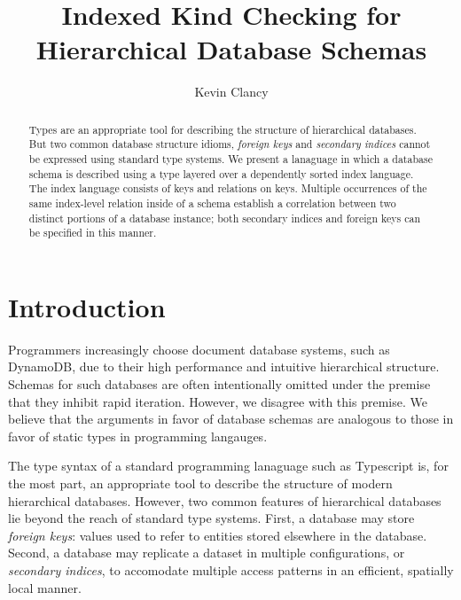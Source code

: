 \documentclass[sigplan,10pt,review,anonymous]{acmart}
\title{Indexed Kind Checking for Hierarchical Database Schemas}
\author{Kevin Clancy}
\begin{document}


\begin{abstract}

Types are an appropriate tool for describing the structure of hierarchical databases. But two common database structure idioms, \emph{foreign keys} and \emph{secondary indices} cannot be expressed using standard type systems. We present a lanaguage in which a database schema is described using a type layered over a dependently sorted index language. The index language consists of keys and relations on keys. Multiple occurrences of the same index-level relation inside of a schema establish a correlation between two distinct portions of a database instance; both secondary indices and foreign keys can be specified in this manner.



\end{abstract}

\maketitle

\section{Introduction}

Programmers increasingly choose document database systems, such as DynamoDB, due to their high performance and intuitive hierarchical structure. Schemas for such databases are often intentionally omitted under the premise that they inhibit rapid iteration. However, we disagree with this premise. We believe that the arguments in favor of database schemas are analogous to those in favor of static types in programming langauges. 

The type syntax of a standard programming lanaguage such as Typescript is, for the most part, an appropriate tool to describe the structure of modern hierarchical databases. However, two common features of hierarchical databases lie beyond the reach of standard type systems. First, a database may store \emph{foreign keys}: values used to refer to entities stored elsewhere in the database. Second, a database may replicate a dataset in multiple configurations, or \emph{secondary indices}, to accomodate multiple access patterns in an efficient, spatially local manner. 
\end{document}
